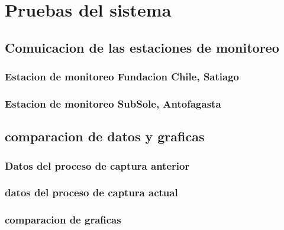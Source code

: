 \chapter{Pruebas del sistema}
\label{pruebas}

\section{Comuicacion de las estaciones de monitoreo}
\subsection{Estacion de monitoreo Fundacion Chile, Satiago}
\subsection{Estacion de monitoreo SubSole, Antofagasta}

\section{comparacion de datos y graficas}
\subsection{Datos del proceso de captura anterior}
\subsection{datos del proceso de captura actual}
\subsection{comparacion de graficas}

